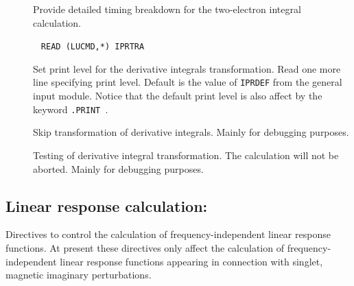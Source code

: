 \begin{description}
\item[] Provide detailed timing breakdown for the
two-electron integral calculation.

\item[]\verb| |\newline
\verb|READ (LUCMD,*) IPRTRA|

Set print level for the derivative integrals transformation.  Read one more
line specifying print level. Default is the value of
\verb|IPRDEF| from the general input module. Notice that the default print
level is also affect by the keyword \verb|.PRINT |.

\item[] Skip transformation of derivative integrals.
Mainly for debugging purposes.

\item[] Testing of derivative integral
transformation. The calculation will not be aborted. Mainly for
debugging purposes.
\end{description}

\subsection{Linear response calculation: }\label{sec:linres}

Directives to control the calculation of frequency-independent linear
response functions. At
present these directives only affect the 
calculation of frequency-independent linear response functions appearing
in connection with singlet, magnetic imaginary perturbations. 

